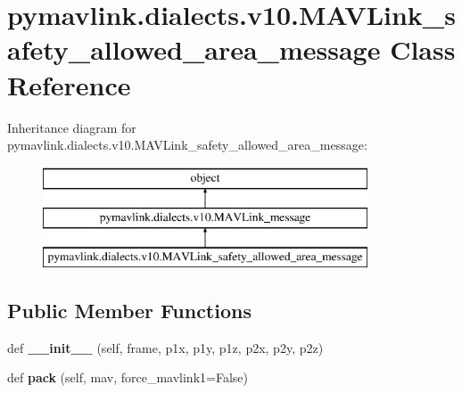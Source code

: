 \hypertarget{classpymavlink_1_1dialects_1_1v10_1_1MAVLink__safety__allowed__area__message}{}\section{pymavlink.\+dialects.\+v10.\+M\+A\+V\+Link\+\_\+safety\+\_\+allowed\+\_\+area\+\_\+message Class Reference}
\label{classpymavlink_1_1dialects_1_1v10_1_1MAVLink__safety__allowed__area__message}
Inheritance diagram for pymavlink.\+dialects.\+v10.\+M\+A\+V\+Link\+\_\+safety\+\_\+allowed\+\_\+area\+\_\+message\+:\begin{figure}[H]
\begin{center}
\leavevmode
\includegraphics[height=3.000000cm]{classpymavlink_1_1dialects_1_1v10_1_1MAVLink__safety__allowed__area__message}
\end{center}
\end{figure}
\subsection*{Public Member Functions}
\begin{DoxyCompactItemize}
\item 
\mbox{\label{classpymavlink_1_1dialects_1_1v10_1_1MAVLink__safety__allowed__area__message_ab9f4e15baf36c1773600dc6c7721941a}} 
def {\bfseries \+\_\+\+\_\+init\+\_\+\+\_\+} (self, frame, p1x, p1y, p1z, p2x, p2y, p2z)
\item 
\mbox{\label{classpymavlink_1_1dialects_1_1v10_1_1MAVLink__safety__allowed__area__message_a054ef26f8e8d2d9205ac4ec4fb03a0b9}} 
def {\bfseries pack} (self, mav, force\+\_\+mavlink1=False)
\end{DoxyCompactItemize}
